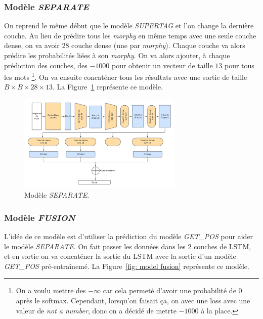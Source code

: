 \documentclass[a4paper]{article}
\begin{document}
\subsubsection{Modèle \textit{SEPARATE}}

On reprend le même début que le modèle \textit{SUPERTAG} et l'on change la dernière couche. Au lieu de prédire tous les 
\textit{morphy} en même temps avec une seule couche dense, on va avoir 28 couche dense (une par \textit{morphy}). Chaque couche
va alors prédire les probabilités liées à son \textit{morphy}. On va alors ajouter, à chaque prédiction des couches, des $- 1000$
pour obtenir un vecteur de taille $13$ pour tous les mots
\footnote{On a voulu mettre des $-\infty$ car cela permeté d'avoir une probabilité de $0$ après le softmax. Cependant, 
lorsqu'on faisait ça, on avec une loss avec une valeur de \textit{not a number}, donc on a décidé de metrte $-1000$ à 
la place.}.
On va ensuite concaténer tous les résultats avec une sortie de 
taille $B \times B \times 28 \times 13$. La Figure~\ref{fig: model separate} représente ce modèle.

\begin{figure}[H]
    \centering
    \includegraphics[width=0.7\textwidth]{get_morphy_separate.png}
    \caption{Modèle \textit{SEPARATE}.}
    \label{fig: model separate}
\end{figure}

\subsubsection{Modèle \textit{FUSION}}

L'idée de ce modèle est d'utiliser la prédiction du modèle \textit{GET\_POS} pour aider le modèle \textit{SEPARATE}.
On fait passer les données dans les 2 couches de LSTM, et en sortie on va concaténer la sortie du LSTM avec la sortie
d'un modèle \textit{GET\_POS} pré-entraînemé.
La Figure~\ref{fig: model fusion} représente ce modèle.
\end{document}
